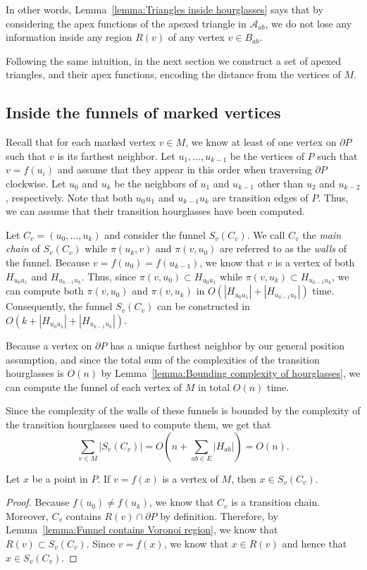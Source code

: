 \documentclass[a4paper,UKenglish]{lipics}
\newcommand{\fn}[2]{\ensuremath{S_{\scriptscriptstyle #1}(#2)}}
\newcommand{\ff}[1]{\ensuremath{f(#1)}}
\newcommand{\p}[2]{\ensuremath{\pi(#1, #2)}}
\begin{document}
In other words, Lemma~\ref{lemma:Triangles inside hourglasses} says that by considering the apex functions of the apexed triangle in $\mathcal A_{ab}$, we do not lose any information inside any region $R(v)$ of any vertex $v\in B_{ab}$.

Following the same intuition, in the next section we construct a set of apexed triangles, and their apex functions, encoding the distance from the vertices of $M$.

\subsection{Inside the funnels of marked vertices}
Recall that for each marked vertex $v\in M$, we know at least of one vertex on $\partial P$ such that $v$ is its farthest neighbor.
Let $u_1, \ldots, u_{k-1}$ be the vertices of $P$ such that $v = \ff{u_i}$ and assume that they appear in this order when traversing $\partial P$ clockwise. Let $u_0$ and $u_k$ be the neighbors of $u_1$ and $u_{k-1}$ other than $u_2$ and $u_{k-2}$, respectively. Note that both $u_0 u_1$ and $u_{k-1}u_k$ are transition edges of $P$. Thus, we can assume that their transition hourglasses have been computed.

Let $C_v = (u_0, \ldots, u_k)$ and consider the funnel $\fn{v}{C_v}$.
We call $C_v$ the \emph{main chain} of $\fn{v}{C_v}$ while $\p{u_k}{ v}$ and $\p{v}{ u_0}$ are referred to as the \emph{walls} of the funnel.  
Because $v = \ff{u_0} = \ff{u_{k-1}}$, we know that $v$ is a vertex of both $H_{u_0 u_1}$ and  $H_{u_{k-1}u_k}$. 
Thus, since $\p{v}{ u_0}\subset H_{u_0u_1}$ while $\p{v}{u_k}\subset H_{u_{k-1}u_k}$, we can compute both $\p{v}{ u_0}$ and $\p{v}{u_k}$ in $O( |H_{u_0 u_1}| + |H_{u_{k-1}u_k}|)$ time.
Consequently, the funnel $\fn{v}{C_v}$ can be constructed in $O(k + |H_{u_0 u_1}| + |H_{u_{k-1}u_k}|)$. 

Because a vertex on $\partial P$ has a unique farthest neighbor by our general position assumption, and since the total sum of the complexities of the transition hourglasses is $O(n)$ by Lemma~\ref{lemma:Bounding complexity of hourglasses}, we can compute the funnel of each vertex of $M$ in total $O(n)$ time. 

Since the complexity of the walls of these funnels is bounded by the complexity of the transition hourglasses used to compute them, we get that $$\sum_{v\in M} |\fn{v}{C_v}|  = O\left(n + \sum_{ab\in E} |H_{ab}|\right) = O(n).$$

\begin{lemma}\label{lemma:Farthest points from marked are in funnel}
Let $x$ be a point in $P$. If $v = \ff{x}$ is a vertex of $M$, then $x\in \fn{v}{C_v}$.
\end{lemma}
\begin{proof}
Because $\ff{u_0} \neq \ff{u_k}$, we know that $C_v$ is a transition chain. Moreover, $C_v$ contains $R(v)\cap \partial P$ by definition. Therefore, by Lemma~\ref{lemma:Funnel contains Voronoi region}, we know that $R(v)\subset \fn{v}{C_v}$.
Since $v = \ff{x}$, we know that $x\in R(v)$ and hence that $x \in \fn{v}{C_v}$. 
\end{proof}
\end{document}
